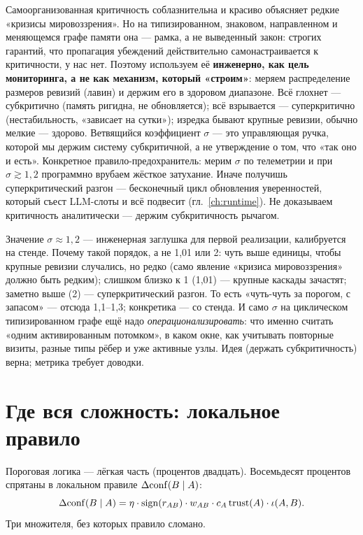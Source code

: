 \begin{pitfall}
Самоорганизованная критичность соблазнительна и красиво объясняет редкие
«кризисы мировоззрения». Но на типизированном, знаковом, направленном и
меняющемся графе памяти она --- рамка, а не выведенный закон: строгих
гарантий, что пропагация убеждений действительно самонастраивается к
критичности, у нас нет. Поэтому используем её \textbf{инженерно, как цель
мониторинга, а не как механизм, который «строим»}: меряем распределение
размеров ревизий (лавин) и держим его в здоровом диапазоне. Всё глохнет ---
субкритично (память ригидна, не обновляется); всё взрывается ---
суперкритично (нестабильность, «зависает на сутки»); изредка бывают крупные
ревизии, обычно мелкие --- здорово. Ветвящийся коэффициент $\sigma$ --- это
управляющая ручка, которой мы держим систему субкритичной, а не утверждение о
том, что «так оно и есть». Конкретное правило-предохранитель: мерим $\sigma$
по телеметрии и при $\sigma \gtrsim 1{,}2$ программно врубаем жёсткое
затухание. Иначе получишь суперкритический разгон --- бесконечный цикл
обновления уверенностей, который съест LLM-слоты и всё подвесит
(гл.~\ref{ch:runtime}). Не доказываем критичность аналитически --- держим
субкритичность рычагом.
\end{pitfall}

\begin{openq}
Значение $\sigma \approx 1{,}2$ --- инженерная заглушка для первой реализации,
калибруется на стенде. Почему такой порядок, а не 1,01 или 2: чуть выше
единицы, чтобы крупные ревизии случались, но редко (само явление «кризиса
мировоззрения» должно быть редким); слишком близко к 1 (1,01) --- крупные
каскады зачастят; заметно выше (2) --- суперкритический разгон. То есть
«чуть-чуть за порогом, с запасом» --- отсюда 1,1--1,3; конкретика --- со
стенда. И само $\sigma$ на циклическом типизированном графе ещё надо
\emph{операционализировать}: что именно считать «одним активированным
потомком», в каком окне, как учитывать повторные визиты, разные типы рёбер и
уже активные узлы. Идея (держать субкритичность) верна; метрика требует
доводки.
\end{openq}

\section{Где вся сложность: локальное правило}

Пороговая логика --- лёгкая часть (процентов двадцать). Восемьдесят процентов
спрятаны в локальном правиле $\Delta\mathrm{conf}(B \mid A)$:
\begin{equation}
\Delta\mathrm{conf}(B \mid A) =
\eta \cdot \mathrm{sign}(r_{AB}) \cdot w_{AB} \cdot c_A\,\mathrm{trust}(A) \cdot \iota(A,B).
\label{eq:deltaconf}
\end{equation}
Три множителя, без которых правило сломано.

